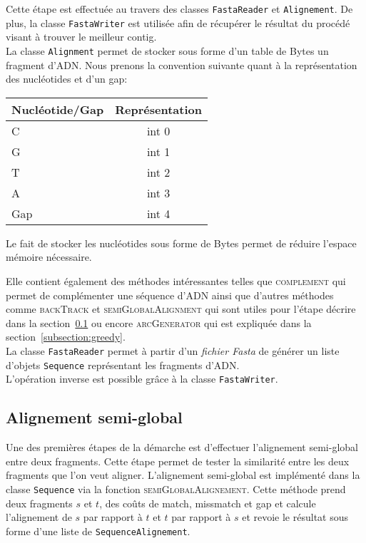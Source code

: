 Cette étape est effectuée au travers des classes \verb|FastaReader| et \verb|Alignement|. De plus, la classe \verb|FastaWriter| est utilisée afin de récupérer le résultat du procédé visant à trouver le meilleur contig.\\

La classe \verb|Alignment| permet de stocker sous forme d'un table de Bytes un fragment d'ADN. Nous prenons la convention suivante quant à la représentation des nucléotides et d'un gap:
	\begin{center}
		\begin{tabular}{|l|c|}
			\hline
			Nucléotide/Gap & Représentation \\
			\hline
			\hline
			C & int 0 \\
			\hline
			G & int 1\\
			\hline
			T & int 2 \\
			\hline
			A & int 3 \\
			\hline
			Gap & int 4 \\
			\hline

		\end{tabular}
	\end{center}
	
	Le fait de stocker les nucléotides sous forme de Bytes permet de réduire l'espace mémoire nécessaire.
		
	  Elle contient également des méthodes intéressantes telles que \textsc{complement} qui permet de complémenter une séquence d'ADN ainsi que d'autres méthodes comme \textsc{backTrack} et \textsc{semiGlobalAlignment} qui sont utiles pour l'étape décrire dans la section~\ref{subsection:semiGlobal} ou encore \textsc{arcGenerator} qui est expliquée dans la section~\ref{subsection:greedy}.\\
	
La classe \verb|FastaReader| permet à partir d'un \emph{fichier Fasta} de générer un liste d'objets \verb|Sequence| représentant les fragments d'ADN. \\

L'opération inverse est possible grâce à la classe \verb|FastaWriter|.


	


\subsection{Alignement semi-global}
\label{subsection:semiGlobal}

Une des premières étapes de la démarche est d'effectuer l'alignement semi-global entre deux fragments. Cette étape permet de tester la similarité entre les deux fragments que l'on veut aligner. L'alignement semi-global est implémenté dans la classe \verb|Sequence| via la fonction \textsc{semiGlobalAlignement}. Cette méthode prend deux fragments $s$ et $t$, des coûts de match, missmatch et gap  et calcule l'alignement de $s$ par rapport à $t$ et $t$ par rapport à $s$ et revoie le résultat sous forme d'une liste de \verb|SequenceAlignement|.\\

